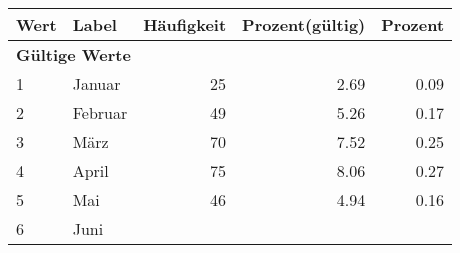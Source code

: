      \begin{longtable}{lXrrr}
     \toprule
     \textbf{Wert} & \textbf{Label} & \textbf{Häufigkeit} & \textbf{Prozent(gültig)} & \textbf{Prozent} \\
     \endhead
     \midrule
     \multicolumn{5}{l}{\textbf{Gültige Werte}}\\

     1 &
     \multicolumn{1}{X}{ Januar   } &


       \num{25} &
       \num[round-mode=places,round-precision=2]{2,69} &
         \num[round-mode=places,round-precision=2]{0,09} \\

     2 &
     \multicolumn{1}{X}{ Februar   } &


       \num{49} &
       \num[round-mode=places,round-precision=2]{5,26} &
         \num[round-mode=places,round-precision=2]{0,17} \\

     3 &
     \multicolumn{1}{X}{ März   } &


       \num{70} &
       \num[round-mode=places,round-precision=2]{7,52} &
         \num[round-mode=places,round-precision=2]{0,25} \\

     4 &
     \multicolumn{1}{X}{ April   } &


       \num{75} &
       \num[round-mode=places,round-precision=2]{8,06} &
         \num[round-mode=places,round-precision=2]{0,27} \\

     5 &
     \multicolumn{1}{X}{ Mai   } &


       \num{46} &
       \num[round-mode=places,round-precision=2]{4,94} &
         \num[round-mode=places,round-precision=2]{0,16} \\

     6 &
     \multicolumn{1}{X}{ Juni   } &



\end{longtable}
